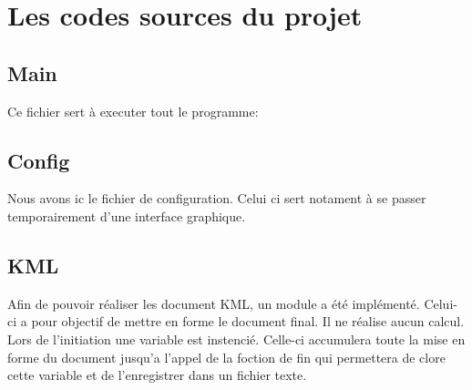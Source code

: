 \chapter{Les codes sources du projet}
    \section{Main}
Ce fichier sert à executer tout le programme:

    \section{Config}
Nous avons ic le fichier de configuration. Celui ci sert notament à se passer temporairement d'une interface graphique.

    \section{KML}
Afin de pouvoir réaliser les document KML, un module a été implémenté. Celui-ci a pour objectif de mettre en forme le document final. Il ne réalise aucun calcul. Lors de l'initiation une variable est instencié. Celle-ci accumulera toute la mise en forme du document jusqu'a l'appel de la foction de fin qui permettera de clore cette variable et de l'enregistrer dans un fichier texte.


